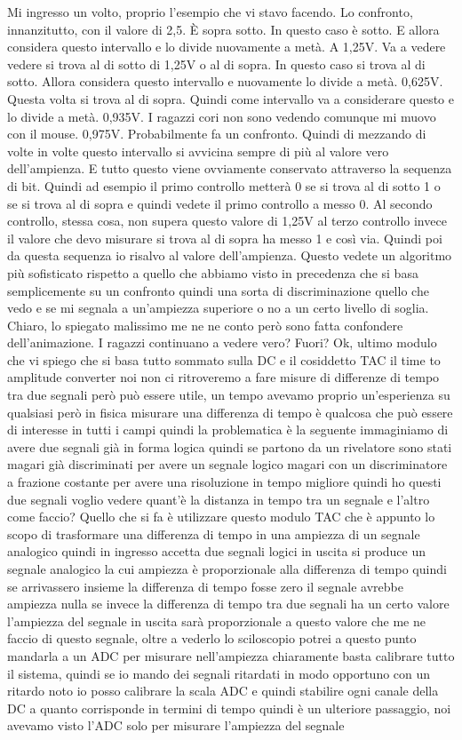 Mi ingresso un volto, proprio l'esempio che vi stavo facendo. Lo confronto, innanzitutto, con il valore di 2,5. È sopra sotto. In questo caso è sotto. E allora considera questo intervallo e lo divide nuovamente a metà. A 1,25V. Va a vedere vedere si trova al di sotto di 1,25V o al di sopra. In questo caso si trova al di sotto. Allora considera questo intervallo e nuovamente lo divide a metà. 0,625V. Questa volta si trova al di sopra. Quindi come intervallo va a considerare questo e lo divide a metà. 0,935V. I ragazzi cori non sono vedendo comunque mi muovo con il mouse. 0,975V. Probabilmente fa un confronto. Quindi di mezzando di volte in volte questo intervallo si avvicina sempre di più al valore vero dell'ampienza. E tutto questo viene ovviamente conservato attraverso la sequenza di bit. Quindi ad esempio il primo controllo metterà 0 se si trova al di sotto 1 o se si trova al di sopra e quindi vedete il primo controllo a messo 0. Al secondo controllo, stessa cosa, non supera questo valore di 1,25V al terzo controllo invece il valore che devo misurare si trova al di sopra ha messo 1 e così via. Quindi poi da questa sequenza io risalvo al valore dell'ampienza. Questo vedete un algoritmo più sofisticato rispetto a quello che abbiamo visto in precedenza che si basa semplicemente su un confronto quindi una sorta di discriminazione quello che vedo e se mi segnala a un'ampiezza superiore o no a un certo livello di soglia. Chiaro, lo spiegato malissimo me ne ne conto però sono fatta confondere dell'animazione. I ragazzi continuano a vedere vero? Fuori? Ok, ultimo modulo che vi spiego che si basa tutto sommato sulla DC e il cosiddetto TAC il time to amplitude converter noi non ci ritroveremo a fare misure di differenze di tempo tra due segnali però può essere utile, un tempo avevamo proprio un'esperienza su qualsiasi però in fisica misurare una differenza di tempo è qualcosa che può essere di interesse in tutti i campi quindi la problematica è la seguente immaginiamo di avere due segnali già in forma logica quindi se partono da un rivelatore sono stati magari già discriminati per avere un segnale logico magari con un discriminatore a frazione costante per avere una risoluzione in tempo migliore quindi ho questi due segnali voglio vedere quant'è la distanza in tempo tra un segnale e l'altro come faccio? Quello che si fa è utilizzare questo modulo TAC che è appunto lo scopo di trasformare una differenza di tempo in una ampiezza di un segnale analogico quindi in ingresso accetta due segnali logici in uscita si produce un segnale analogico la cui ampiezza è proporzionale alla differenza di tempo quindi se arrivassero insieme la differenza di tempo fosse zero il segnale avrebbe ampiezza nulla se invece la differenza di tempo tra due segnali ha un certo valore l'ampiezza del segnale in uscita sarà proporzionale a questo valore che me ne faccio di questo segnale, oltre a vederlo lo sciloscopio potrei a questo punto mandarla a un ADC per misurare nell'ampiezza chiaramente basta calibrare tutto il sistema, quindi se io mando dei segnali ritardati in modo opportuno con un ritardo noto io posso calibrare la scala ADC e quindi stabilire ogni canale della DC a quanto corrisponde in termini di tempo quindi è un ulteriore passaggio, noi avevamo visto l'ADC solo per misurare l'ampiezza del segnale 